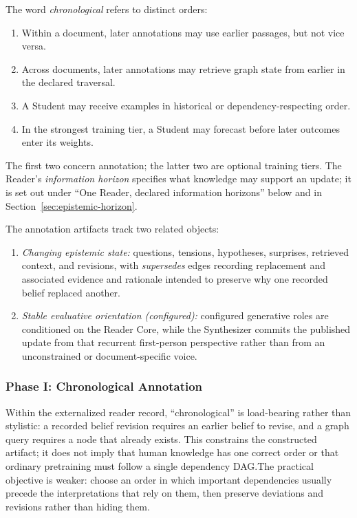 \documentclass[11pt]{article}
\begin{document}
The word \emph{chronological} refers to distinct orders:
\begin{enumerate}
\item Within a document, later annotations may use earlier passages, but not vice versa.
\item Across documents, later annotations may retrieve graph state from earlier
in the declared traversal.
\item A Student may receive examples in historical or dependency-respecting order.
\item In the strongest training tier, a Student may forecast before later
outcomes enter its weights.
\end{enumerate}
The first two concern annotation; the latter two are optional training tiers.
The Reader's \emph{information horizon} specifies what knowledge may support
an update; it is set out under \enquote{One Reader, declared information
horizons} below and in Section~\ref{sec:epistemic-horizon}.

The annotation artifacts track two related objects:

\begin{enumerate}[leftmargin=*,itemsep=0.3em]
    \item \emph{Changing epistemic state:} questions, tensions, hypotheses,
    surprises, retrieved context, and revisions, with \emph{supersedes} edges
    recording replacement and associated evidence and rationale intended to
    preserve why one recorded belief replaced another.
    \item \emph{Stable evaluative orientation (configured):} configured generative roles are
    conditioned on the Reader Core, while the Synthesizer commits the published
    update from that recurrent first-person perspective rather than from an
    unconstrained or document-specific voice.
\end{enumerate}

\subsubsection{Phase I: Chronological Annotation}\label{sec:annotation-phase}

Within the externalized reader record, ``chronological'' is load-bearing rather
than stylistic: a recorded belief revision requires an earlier belief to revise,
and a graph query requires a node that already exists. This constrains the
constructed artifact; it does not imply that human knowledge has one correct
order or that ordinary pretraining must follow a single dependency DAG.\@ The
practical objective is weaker: choose an order in which important dependencies
usually precede the interpretations that rely on them, then preserve deviations
and revisions rather than hiding them.
\end{document}

